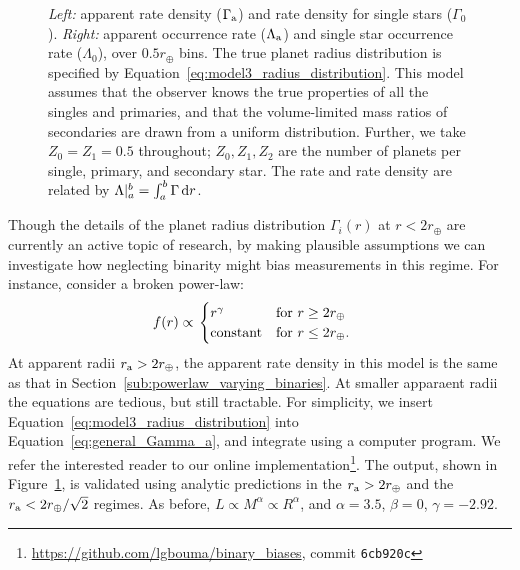 \documentclass[12pt,modern]{aastex61}
\renewcommand{\a}{_{\rm a}}
\begin{document}
\begin{figure}[!t]
    \centering
    \caption{
        {\it Left:} apparent rate density ($\Gamma\a$) and rate density for 
        single stars ($\Gamma_0$). {\it Right:} apparent occurrence
        rate ($\Lambda\a$) and single star occurrence rate
        ($\Lambda_0$), over $0.5r_\oplus$ bins.  The true planet
        radius distribution is specified by
        Equation~\ref{eq:model3_radius_distribution}.  This model
        assumes that the observer knows the true properties of all the
        singles and primaries, and that the volume-limited mass ratios
        of secondaries are drawn from a uniform distribution. Further,
        we take $Z_0=Z_1=0.5$ throughout; $Z_0,Z_1,Z_2$ are the number
        of planets per single, primary, and secondary star.  The rate
        and rate density are related by $\Lambda|_a^b =
        \int_{a}^{b}\Gamma\,{\rm d}r$.
    }
    \label{fig:occ_rate_model_3_log}
\end{figure}

Though the details of the planet radius distribution $\Gamma_i(r)$ at
$r<2r_\oplus$ are currently an active topic of research, by making
plausible assumptions we can investigate how neglecting binarity might
bias measurements in this regime.  For instance, consider a broken
power-law:
\begin{align}
    f(r)
    &\propto
    \left.
    \begin{cases}
        r^\gamma & \text{for } r\geq 2r_\oplus \\
        {\rm constant} & \text{for } r\leq2r_\oplus.
    \end{cases}
    \right.
    \label{eq:model3_radius_distribution}
\end{align}
At apparent radii $r\a > 2r_\oplus$, the apparent rate density in
this model is the same as that in
Section~\ref{sub:powerlaw_varying_binaries}.  At smaller apparaent
radii the equations are tedious, but still tractable.
For simplicity, we insert Equation~\ref{eq:model3_radius_distribution}
into Equation~\ref{eq:general_Gamma_a}, and integrate using a computer
program. We refer the interested reader to our online
implementation\footnote{\url{https://github.com/lgbouma/binary_biases},
commit \texttt{6cb920c}}.
The output, shown in Figure~\ref{fig:occ_rate_model_3_log}, is
validated using analytic predictions in the $r\a > 2r_\oplus$ and the
$r\a < 2r_\oplus/\sqrt{2}$ regimes.  As before, $L\propto M^\alpha
\propto R^\alpha$, and $\alpha=3.5$, $\beta=0$, $\gamma=-2.92$.  
\end{document}
